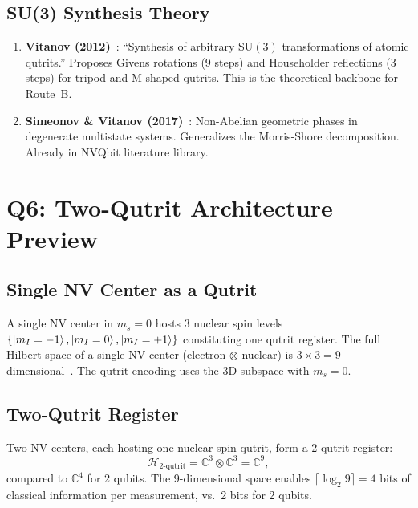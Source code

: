 \documentclass[11pt,letterpaper]{article}
\newcommand{\SU}{\mathrm{SU}}
\begin{document}
\subsection{SU(3) Synthesis Theory}

\begin{enumerate}[label=(\alph*)]
  \item \textbf{Vitanov (2012)}~\cite{Vitanov2012}: ``Synthesis of arbitrary $\SU(3)$
    transformations of atomic qutrits.'' Proposes Givens rotations (9 steps) and
    Householder reflections (3 steps) for tripod and M-shaped qutrits. This is the
    theoretical backbone for Route~B. %

  \item \textbf{Simeonov \& Vitanov (2017)}~\cite{Vitanov2017}: Non-Abelian geometric
    phases in degenerate multistate systems. Generalizes the Morris-Shore decomposition.
    Already in NVQbit literature library.
\end{enumerate}


\section{Q6: Two-Qutrit Architecture Preview}
\label{sec:Q6}

\subsection{Single NV Center as a Qutrit}

A single NV center in $m_s = 0$ hosts 3 nuclear spin levels
$\{\ket{m_I = -1}, \ket{m_I = 0}, \ket{m_I = +1}\}$ constituting one qutrit register.
The full Hilbert space of a single NV center (electron $\otimes$ nuclear) is
$3 \times 3 = 9$-dimensional~\cite{Doherty2013}. The qutrit encoding uses the 3D
subspace with $m_s = 0$.

\subsection{Two-Qutrit Register}

Two NV centers, each hosting one nuclear-spin qutrit, form a 2-qutrit register:
\begin{equation}
  \mathcal{H}_{2\text{-qutrit}} = \mathbb{C}^3 \otimes \mathbb{C}^3 = \mathbb{C}^9,
  \label{eq:2qutrit}
\end{equation}
compared to $\mathbb{C}^4$ for 2 qubits. The 9-dimensional space enables
$\lceil \log_2 9 \rceil = 4$ bits of classical information per measurement, vs.\ 2 bits
for 2 qubits.
\end{document}
